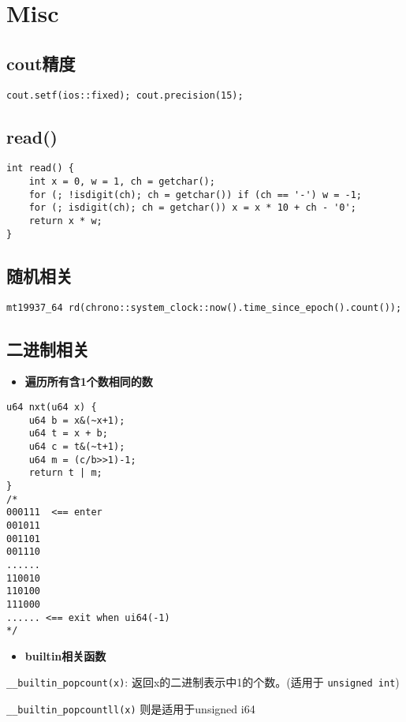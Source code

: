 \documentclass[a4paper,landscape,twocolumn]{ctexart}
\newcommand{\point}[1]{
	\begin{itemize}
		\item \textbf{#1}
	\end{itemize}
}
\begin{document}
\section{Misc}

\subsection{cout精度}

\begin{lstlisting}
cout.setf(ios::fixed); cout.precision(15);
\end{lstlisting}

\subsection{read()}

\begin{lstlisting}
int read() {
	int x = 0, w = 1, ch = getchar();
	for (; !isdigit(ch); ch = getchar()) if (ch == '-') w = -1;
	for (; isdigit(ch); ch = getchar()) x = x * 10 + ch - '0';
	return x * w;
}
\end{lstlisting}

\subsection{随机相关}

\begin{lstlisting}
mt19937_64 rd(chrono::system_clock::now().time_since_epoch().count());
\end{lstlisting}

\subsection{二进制相关}

\point{遍历所有含1个数相同的数}

\begin{lstlisting}
u64 nxt(u64 x) {
	u64 b = x&(~x+1);
	u64 t = x + b;
	u64 c = t&(~t+1);
	u64 m = (c/b>>1)-1;
	return t | m;
}
/*
000111  <== enter
001011
001101
001110
......
110010
110100
111000
...... <== exit when ui64(-1)
*/
\end{lstlisting}

\point{builtin相关函数}

\texttt{\_\_builtin\_popcount(x)}: 返回x的二进制表示中1的个数。(适用于 \texttt{unsigned int})

\texttt{\_\_builtin\_popcountll(x)} 则是适用于unsigned i64
\end{document}
